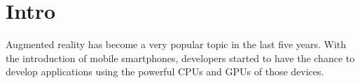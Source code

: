 \chapter{Intro}
Augmented reality has become a very popular topic in the last five years. With
the introduction of mobile smartphones, developers started to have the chance
to develop applications using the powerful CPUs and GPUs of those devices. 
